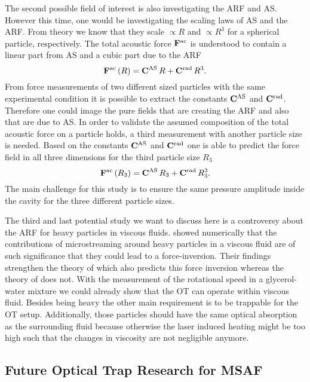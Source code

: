 The second possible field of interest is also investigating the ARF and AS.  
However this time, one would be investigating the scaling laws of AS and the 
ARF. From theory we know that they scale $\propto R$ and $\propto R^{3}$ for a 
spherical particle, respectively. The total acoustic force 
$\vb{F}^{\mathrm{ac}}$ is understood to contain a linear part from AS and a 
cubic part due to the ARF
\begin{equation}
  \vb{F}^{\mathrm{ac}}\left( R \right) = \vb{C}^{\mathrm{AS}}\,R + 
  \vb{C}^{\mathrm{rad}}\,R^{3}.
\end{equation}
From force measurements of two different sized particles with the same 
experimental condition it is possible to extract the constants 
$\vb{C}^{\mathrm{AS}}$ and $\vb{C}^{\mathrm{rad}}$. Therefore one could image the pure 
fields that are creating the ARF and also that are due to AS. In order to 
validate the assumed composition of the total acoustic force on a particle 
holds, a third measurement with another particle size is needed. Based on the 
constants $\vb{C}^{\mathrm{AS}}$ and $\vb{C}^{\mathrm{rad}}$ one is able to predict the 
force field in all three dimensions for the third particle size $R_{3}$
\begin{equation}
  \vb{F}^{\mathrm{ac}}\left( R_{3} \right) = \vb{C}^{\mathrm{AS}}\,R_{3} + 
  \vb{C}^{\mathrm{rad}}\,R^{3}_{3}.
\end{equation}
The main challenge for this study is to ensure the same pressure amplitude 
inside the cavity for the three different particle sizes.

The third and last potential study we want to discuss here is a controversy 
about the ARF for heavy particles in viscous fluids.  showed 
numerically that the contributions of microstreaming around heavy particles in 
a viscous fluid are of such significance that they could lead to a 
force-inversion. Their findings strengthen the theory of 
 which also predicts this force inversion whereas the 
theory of  does not. With the measurement of the rotational 
speed in a glycerol-water mixture we could already show that the OT can operate 
within viscous fluid. Besides being heavy the other main requirement is to be 
trappable for the OT setup. Additionally, those particles should have the same 
optical absorption as the surrounding fluid because otherwise the laser induced 
heating might be too high such that the changes in viscosity are not negligible 
anymore.

\subsection{Future Optical Trap Research for MSAF}

